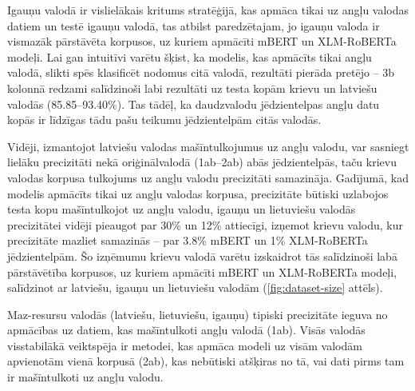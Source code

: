 
Igauņu valodā ir vislielākais kritums stratēģijā, kas apmāca tikai uz angļu valodas datiem un testē igauņu valodā, tas atbilst paredzētajam, jo igauņu valoda ir vismazāk pārstāvēta korpusos, uz kuriem apmācīti mBERT un XLM-RoBERTa modeļi. Lai gan intuitīvi varētu šķist, ka modelis, kas apmācīts tikai angļu valodā, slikti spēs klasificēt nodomus citā valodā, rezultāti pierāda pretējo -- 3b kolonnā redzami salīdzinoši labi rezultāti uz testa kopām krievu un latviešu valodās (85.85--93.40\%). Tas tādēļ, ka daudzvalodu jēdzientelpas angļu datu kopās ir līdzīgas tādu pašu teikumu jēdzientelpām citās valodās.




Vidēji, izmantojot latviešu valodas mašīntulkojumus uz angļu valodu, var sasniegt lielāku precizitāti nekā oriģinālvalodā (1ab--2ab) abās jēdzientelpās, taču krievu valodas korpusa tulkojums uz angļu valodu precizitāti samazināja. Gadījumā, kad modelis apmācīts tikai uz angļu valodas korpusa, precizitāte būtiski uzlabojos testa kopu mašīntulkojot uz angļu valodu, igauņu un lietuviešu valodās precizitātei vidēji pieaugot par 30\% un 12\% attiecīgi, izņemot krievu valodu, kur precizitāte mazliet samazinās -- par 3.8\% mBERT un 1\% XLM-RoBERTa jēdzientelpām. Šo izņēmumu krievu valodā varētu izskaidrot tās salīdzinoši labā pārstāvētība korpusos, uz kuriem apmācīti mBERT un XLM-RoBERTa modeļi, salīdzinot ar latviešu, igauņu un lietuviešu valodām (\ref{fig:dataset-size} attēls).



Maz-resursu valodās (latviešu, lietuviešu, igauņu) tipiski precizitāte ieguva no apmācības uz datiem, kas mašīntulkoti angļu valodā (1ab). Visās valodās visstabilākā veiktspēja ir metodei, kas apmāca modeli uz visām valodām apvienotām vienā korpusā (2ab), kas nebūtiski atšķiras no tā, vai dati pirms tam ir mašīntulkoti uz angļu valodu.

